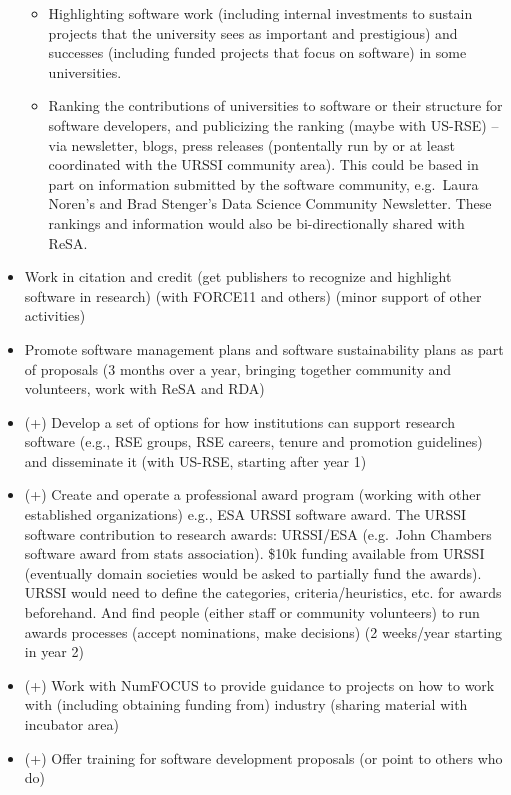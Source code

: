\documentclass[
]{book}
\begin{document}
\begin{itemize}
  \begin{itemize}
  \item
    Highlighting software work (including internal investments to sustain projects that the
    university sees as important and prestigious) and successes (including funded projects that
    focus on software) in some universities.
  \item
    Ranking the contributions of universities to software or their structure for software developers,
    and publicizing the ranking (maybe with US-RSE) -- via newsletter, blogs, press releases
    (pontentally run by or at least coordinated with the URSSI community area). This could be based in
    part on information submitted by the software community, e.g.~Laura Noren's and Brad Stenger's Data
    Science Community Newsletter. These rankings and information would also be bi-directionally shared
    with ReSA.
  \end{itemize}
\item
  Work in citation and credit (get publishers to recognize and highlight software in
  research) (with FORCE11 and others) (minor support of other activities)
\item
  Promote software management plans and software sustainability plans as part of proposals
  (3 months over a year, bringing together community and volunteers, work with ReSA and RDA)
\item
  (+) Develop a set of options for how institutions can support research software (e.g., RSE groups,
  RSE careers, tenure and promotion guidelines) and disseminate it (with US-RSE, starting after year 1)
\item
  (+) Create and operate a professional award program (working with other established organizations)
  e.g., ESA URSSI software award. The URSSI software contribution to research awards: URSSI/ESA
  (e.g.~John Chambers software award from stats association). \$10k funding available from URSSI
  (eventually domain societies would be asked to partially fund the awards). URSSI would need to
  define the categories, criteria/heuristics, etc. for awards beforehand. And find people
  (either staff or community volunteers) to run awards processes (accept nominations, make decisions)
  (2 weeks/year starting in year 2)
\item
  (+) Work with NumFOCUS to provide guidance to projects on how to work with (including obtaining
  funding from) industry (sharing material with incubator area)
\item
  (+) Offer training for software development proposals (or point to others who do)


\end{itemize}
\end{document}
